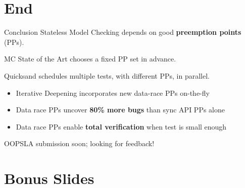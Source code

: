\documentclass[xcolor=dvipsnames]{beamer}
\begin{document}

\section{End}

\begin{frame}{Conclusion}
	Stateless Model Checking depends on good {\bf preemption points} (PPs).
	\linegap

	MC State of the Art chooses a fixed PP set in advance.
	\linegap

	Quicksand schedules multiple tests, with different PPs, in parallel.
	\begin{itemize}
		\item Iterative Deepening incorporates new data-race PPs on-the-fly
		\item Data race PPs uncover {\bf 80\% more bugs} than sync API PPs alone
		\item Data race PPs enable {\bf total verification} when test is small enough
	\end{itemize}
	\linegap

	OOPSLA submission soon; looking for feedback!
\end{frame}



\section{Bonus Slides}
\end{document}
